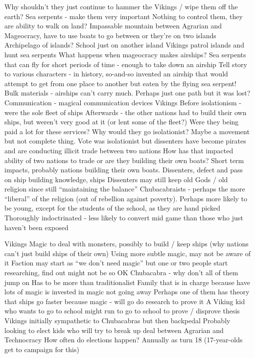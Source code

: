 \documentclass[blue]{GL2020}
\begin{document}
Why shouldn’t they just continue to hammer the Vikings / wipe them off the earth?
Sea serpents - make them very important
Nothing to control them, they are ability to walk on land?
Impassable mountain between Agrarian and Mageocracy, have to use boats to go between or they’re on two islands
Archipelago of islands?  School just on another island
Vikings patrol islands and hunt sea serpents
What happens when mageocracy makes airships?
Sea serpents that can fly for short periods of time - enough to take down an airship
Tell story to various characters - in history, so-and-so invented an airship that would attempt to get from one place to another but eaten by the flying sea serpent!
Bulk materials - airships can’t carry much.  Perhaps just one path but it was lost?
Communication - magical communication devices
Vikings 
Before isolationism - were the sole fleet of ships
Afterwards - the other nations had to build their own ships, but weren’t very good at it (or lent some of the fleet?)
Were they being paid a lot for these services?  Why would they go isolationist?  Maybe a movement but not complete thing.  Vote was isolationist but dissenters have become pirates and are conducting illicit trade between two nations
How has that impacted ability of two nations to trade or are they building their own boats?  Short term impacts, probably nations building their own boats.  Dissenters, defect and pass on ship building knowledge, ships
Dissenters may still keep old Gods / old religion since still “maintaining the balance”
Chubacabraists - perhaps the more “liberal” of the religion (out of rebellion against poverty).  Perhaps more likely to be young, except for the students of the school, as they are hand picked
Thoroughly indoctrinated - less likely to convert mid game than those who just haven’t been exposed


Vikings
Magic to deal with monsters, possibly to build / keep ships (why nations can’t just build ships of their own)
Using more subtle magic, may not be aware of it
Faction may start as “we don’t need magic” but one or two people start researching, find out might not be so OK
Chubacabra - why don’t all of them jump on
Has to be more than traditionalist
Family that is in charge because have lots of magic is invested in magic not going away
Perhaps one of them has theory that ships go faster because magic - will go do research to prove it
A Viking kid who wants to go to school might run to go to school to prove / disprove thesis
Vikings initially sympathetic to Chubacabras but then backpedal
Probably looking to elect kids who will try to break up deal between Agrarian and Technocracy
How often do elections happen?  Annually as turn 18 (17-year-olds get to campaign for this)
\end{document}
